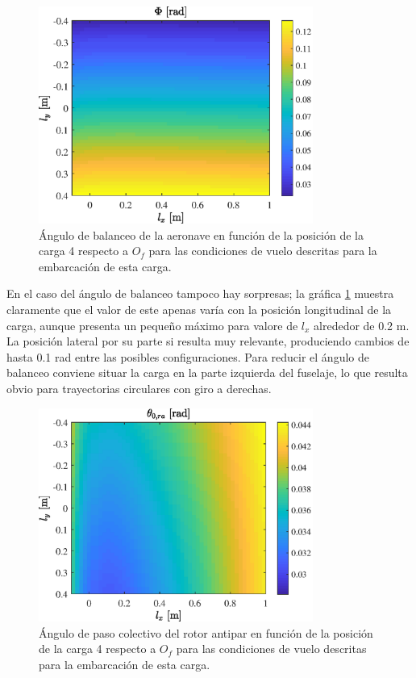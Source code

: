 \begin{figure}
	\centering
	\includegraphics[width=90mm]{graficos/BalanSP}
	\caption{Ángulo de balanceo de la aeronave en función de la posición de la carga 4 respecto a $O_f$ para las condiciones de vuelo descritas para la embarcación de esta carga.}
	\label{BalanSP}
\end{figure}

En el caso del ángulo de balanceo tampoco hay sorpresas; la gráfica \ref{BalanSP} muestra claramente que el valor de este apenas varía con la posición longitudinal de la carga, aunque presenta un pequeño máximo para valore de $l_x$ alrededor de 0.2 m. La posición lateral por su parte si resulta muy relevante, produciendo cambios de hasta 0.1 rad entre las posibles configuraciones. Para reducir el ángulo de balanceo conviene situar la carga en la parte izquierda del fuselaje, lo que resulta obvio para trayectorias circulares con giro a derechas.

\begin{figure}
	\centering
	\includegraphics[width=90mm]{graficos/theta0raSP}
	\caption{Ángulo de paso colectivo del rotor antipar en función de la posición de la carga 4 respecto a $O_f$ para las condiciones de vuelo descritas para la embarcación de esta carga.}
	\label{theta0raSP}
\end{figure}

